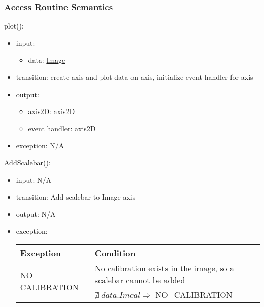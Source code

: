 \documentclass[12pt, titlepage]{article}
\begin{document}
\subsubsection{Access Routine Semantics}

\noindent plot():
\begin{itemize}
    \item input:
    \begin{itemize}
        \item data: \hyperref[Mod:Image]{Image}
    \end{itemize}
    \item transition: create axis and plot data on axis, initialize event handler for axis
    \item output:
    \begin{itemize}
        \item axis2D: \hyperref[Mod:Plotting]{axis2D}
        \item event handler: \hyperref[Mod:Plotting]{axis2D}
    \end{itemize}
    \item exception: N/A
\end{itemize}

\noindent AddScalebar():
\begin{itemize}
    \item input: N/A
    \item transition: Add scalebar to Image axis
    \item output: N/A
    \item exception: 
    \begin{center}
        \begin{tabular}{p{3.5cm} p{12cm}}
            \toprule[0.15em]
            \textbf{Exception} & \textbf{Condition}\\
            \midrule[0.1em]
            \multirow{2}{0.25\textwidth}{NO CALIBRATION} & No calibration exists in the image, so a scalebar cannot be added\\ 
            & $\nexists\ data.Imcal \Rightarrow$ NO\_CALIBRATION\\ 
            \bottomrule[0.15em]
        \end{tabular}
    \end{center}
\end{itemize}
\end{document}

